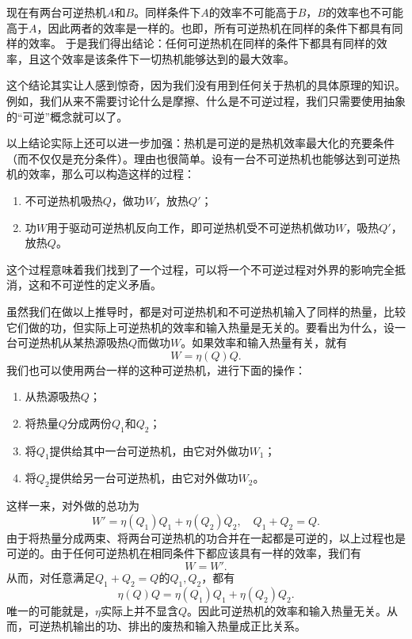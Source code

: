 \documentclass[hyperref, UTF8, a4paper]{ctexart}
\begin{document}
现在有两台可逆热机$A$和$B$。同样条件下$A$的效率不可能高于$B$，$B$的效率也不可能高于$A$，因此两者的效率是一样的。也即，所有可逆热机在同样的条件下都具有同样的效率。
于是我们得出结论：任何可逆热机在同样的条件下都具有同样的效率，且这个效率是该条件下一切热机能够达到的最大效率。

这个结论其实让人感到惊奇，因为我们没有用到任何关于热机的具体原理的知识。例如，我们从来不需要讨论什么是摩擦、什么是不可逆过程，我们只需要使用抽象的“可逆”概念就可以了。

以上结论实际上还可以进一步加强：热机是可逆的是热机效率最大化的充要条件（而不仅仅是充分条件）。理由也很简单。设有一台不可逆热机也能够达到可逆热机的效率，那么可以构造这样的过程：
\begin{enumerate}
    \item 不可逆热机吸热$Q$，做功$W$，放热$Q'$；
    \item 功$W$用于驱动可逆热机反向工作，即可逆热机受不可逆热机做功$W$，吸热$Q'$，放热$Q$。
\end{enumerate}
这个过程意味着我们找到了一个过程，可以将一个不可逆过程对外界的影响完全抵消，这和不可逆性的定义矛盾。

虽然我们在做以上推导时，都是对可逆热机和不可逆热机输入了同样的热量，比较它们做的功，但实际上可逆热机的效率和输入热量是无关的。要看出为什么，设一台可逆热机从某热源吸热$Q$而做功$W$。如果效率和输入热量有关，就有
\[
    W = \eta(Q) Q.
\]
我们也可以使用两台一样的这种可逆热机，进行下面的操作：
\begin{enumerate}
    \item 从热源吸热$Q$；
    \item 将热量$Q$分成两份$Q_1$和$Q_2$；
    \item 将$Q_1$提供给其中一台可逆热机，由它对外做功$W_1$；
    \item 将$Q_2$提供给另一台可逆热机，由它对外做功$W_2$。
\end{enumerate}
这样一来，对外做的总功为
\[
    W' = \eta(Q_1) Q_1 + \eta(Q_2) Q_2, \quad Q_1 + Q_2 = Q.
\]
由于将热量分成两束、将两台可逆热机的功合并在一起都是可逆的，以上过程也是可逆的。由于任何可逆热机在相同条件下都应该具有一样的效率，我们有
\[
    W = W'.
\]
从而，对任意满足$Q_1 + Q_2 = Q$的$Q_1, Q_2$，都有
\[
    \eta(Q) Q = \eta(Q_1) Q_1 + \eta(Q_2) Q_2.
\]
唯一的可能就是，$\eta$实际上并不显含$Q$。因此可逆热机的效率和输入热量无关。从而，可逆热机输出的功、排出的废热和输入热量成正比关系。
\end{document}
